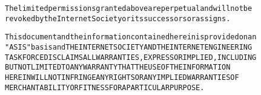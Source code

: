 \small\begin{alltt}   The limited permissions granted above are perpetual and will not be
   revoked by the Internet Society or its successors or assigns.\end{alltt}\normalsize 


\small\begin{alltt}   This document and the information contained herein is provided on an
   "AS IS" basis and THE INTERNET SOCIETY AND THE INTERNET ENGINEERING
   TASK FORCE DISCLAIMS ALL WARRANTIES, EXPRESS OR IMPLIED, INCLUDING
   BUT NOT LIMITED TO ANY WARRANTY THAT THE USE OF THE INFORMATION
   HEREIN WILL NOT INFRINGE ANY RIGHTS OR ANY IMPLIED WARRANTIES OF
   MERCHANTABILITY OR FITNESS FOR A PARTICULAR PURPOSE.
\end{alltt}\normalsize 
 

